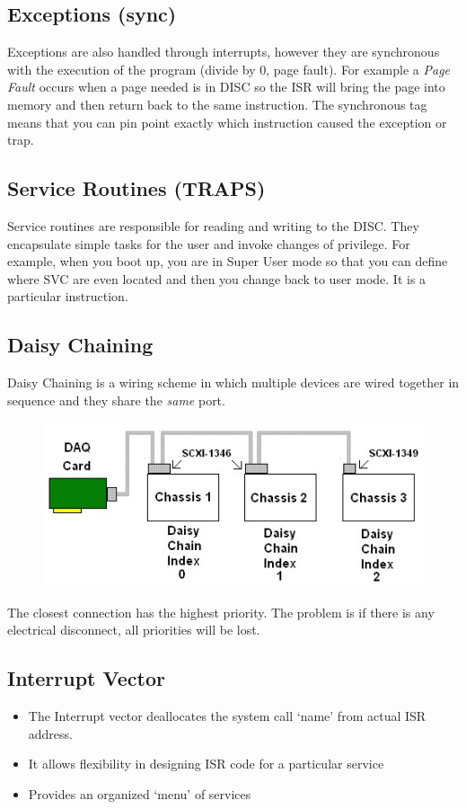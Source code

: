 \documentclass{hw}
\begin{document}
\subsection{Exceptions (sync)}
Exceptions are also handled through interrupts, however they are synchronous with
the execution of the program (divide by 0, page fault). For example a 
\emph{Page Fault} occurs when a page needed is in DISC so the ISR will bring the 
page into memory and then return back to the same instruction. The synchronous 
tag means that you can pin point exactly which instruction caused the exception
or trap.

\subsection{Service Routines (TRAPS)}
Service routines are responsible for reading and writing to the DISC\@.  They 
encapsulate simple tasks for the user and invoke changes of privilege. For example,
when you boot up, you are in Super User mode so that you can define where SVC are
even located and then you change back to user mode. It is a particular instruction.

\subsection{Daisy Chaining}
Daisy Chaining is a wiring scheme in which multiple devices are wired together 
in sequence and they share the \emph{same} port.
\begin{figure}[H]
  \centering
  \includegraphics[scale=.8]{dchain}
\end{figure}

The closest connection has the highest priority. The problem is if there is any
electrical disconnect, all priorities will be lost. 

\subsection{Interrupt Vector}
\begin{itemize}
  \item The Interrupt vector deallocates the system call `name' from actual ISR
    address.
  \item It allows flexibility in designing ISR code for a particular service
  \item Provides an organized `menu' of services
\end{itemize}
\end{document}
